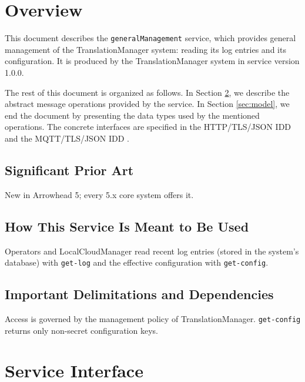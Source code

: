 \documentclass[a4paper]{arrowhead}
\begin{document}
\section{Overview}
\label{sec:overview}

This document describes the \texttt{generalManagement} service, which provides general management of the Translation\allowbreak{}Manager system: reading its log entries and its configuration.
It is produced by the TranslationManager system \cite{tm-sysd} in service version 1.0.0.

The rest of this document is organized as follows.
In Section \ref{sec:operations}, we describe the abstract message operations provided by the service.
In Section \ref{sec:model}, we end the document by presenting the data types used by the mentioned operations.
The concrete interfaces are specified in the HTTP/TLS/JSON IDD \cite{tm-generalManagement-http-idd} and the MQTT/TLS/JSON IDD \cite{tm-generalManagement-mqtt-idd}.

\subsection{Significant Prior Art}

New in Arrowhead 5; every 5.x core system offers it.

\subsection{How This Service Is Meant to Be Used}

Operators and LocalCloudManager read recent log entries (stored in the system's database) with \texttt{get-\allowbreak{}log} and the effective configuration with \texttt{get-\allowbreak{}config}.

\subsection{Important Delimitations and Dependencies}
\label{sec:delimitations}

Access is governed by the management policy of Translation\allowbreak{}Manager. \texttt{get-\allowbreak{}config} returns only non-secret configuration keys.

\newpage

\section{Service Interface}
\label{sec:operations}
\end{document}
